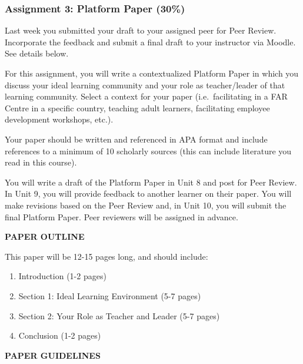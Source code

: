 \documentclass[
]{book}
\providecommand{\tightlist}{%
  \setlength{\itemsep}{0pt}\setlength{\parskip}{0pt}}
\begin{document}
\begin{assessment}
\hypertarget{assignment-3-platform-paper-30}{%
\subsubsection{Assignment 3: Platform Paper
(30\%)}\label{assignment-3-platform-paper-30}}

Last week you submitted your draft to your assigned peer for Peer
Review. Incorporate the feedback and submit a final draft to your
instructor via Moodle. See details below.

For this assignment, you will write a contextualized Platform Paper in
which you discuss your ideal learning community and your role as
teacher/leader of that learning community. Select a context for your
paper (i.e.~facilitating in a FAR Centre in a specific country, teaching
adult learners, facilitating employee development workshops, etc.).

Your paper should be written and referenced in APA format and include
references to a minimum of 10 scholarly sources (this can include
literature you read in this course).

You will write a draft of the Platform Paper in Unit 8 and post for Peer
Review. In Unit 9, you will provide feedback to another learner on their
paper. You will make revisions based on the Peer Review and, in Unit 10,
you will submit the final Platform Paper. Peer reviewers will be
assigned in advance.

\textbf{PAPER OUTLINE}

This paper will be 12-15 pages long, and should include:

\begin{enumerate}
\def\labelenumi{\arabic{enumi}.}
\tightlist
\item
  Introduction (1-2 pages)
\item
  Section 1: Ideal Learning Environment (5-7 pages)
\item
  Section 2: Your Role as Teacher and Leader (5-7 pages)
\item
  Conclusion (1-2 pages)
\end{enumerate}

\textbf{PAPER GUIDELINES}


\end{assessment}
\end{document}
